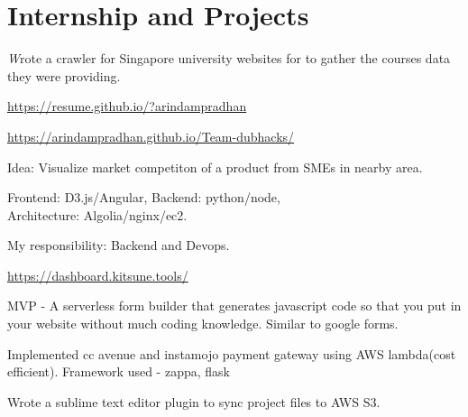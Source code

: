 \documentclass[]{deedy-resume-openfont}
\begin{document}
\begin{minipage}[t]{0.66\textwidth}
\section{Internship and Projects}

\begin{tightemize}
\item \emph Wrote a crawler for Singapore university websites for to gather the courses data they were providing. \end{tightemize}
\sectionsep

{ \url{https://resume.github.io/?arindampradhan } }\\
\sectionsep

{ \url{https://arindampradhan.github.io/Team-dubhacks/} }\\
\begin{tightemize}
\item Idea: Visualize market competiton of a product from SMEs in nearby area.
\item Frontend: D3.js/Angular,  Backend: python/node, \\ Architecture: Algolia/nginx/ec2.
\item My responsibility: Backend and Devops.
\vspace{\topsep} %
\end{tightemize}

{ \url{https://dashboard.kitsune.tools/} }\\
\begin{tightemize}
\item MVP - A serverless form builder that generates javascript code so that you put in your website without much coding knowledge. Similar to google forms.
\vspace{\topsep} %
\end{tightemize}

\begin{tightemize}
\item Implemented cc avenue and instamojo payment gateway using AWS lambda(cost efficient). Framework used - zappa, flask
\item Wrote a sublime text editor plugin to sync project files to AWS S3.
\vspace{\topsep} %
\end{tightemize}


\end{minipage}
\end{document}
